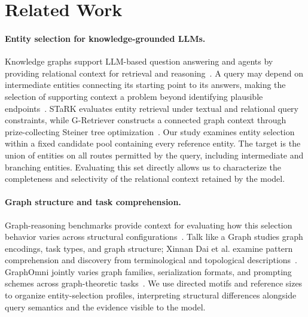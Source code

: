 \section{Related Work}
\label{sec:related}

\paragraph{Entity selection for knowledge-grounded LLMs.}
Knowledge graphs support LLM-based question answering and agents by providing relational context for retrieval and reasoning~\cite{luo2024rog,ghandi2026graphwalk}. A query may depend on intermediate entities connecting its starting point to its answers, making the selection of supporting context a problem beyond identifying plausible endpoints~\cite{luo2024rog}. STaRK evaluates entity retrieval under textual and relational query constraints, while G-Retriever constructs a connected graph context through prize-collecting Steiner tree optimization~\cite{wu2024stark,he2024gretriever}. Our study examines entity selection within a fixed candidate pool containing every reference entity. The target is the union of entities on all routes permitted by the query, including intermediate and branching entities. Evaluating this set directly allows us to characterize the completeness and selectivity of the relational context retained by the model.

\paragraph{Graph structure and task comprehension.}
Graph-reasoning benchmarks provide context for evaluating how this selection behavior varies across structural configurations~\cite{fatemi2024talklikegraph,dai2025graphpatterns,xu2026graphomni}. Talk like a Graph studies graph encodings, task types, and graph structure; Xinnan Dai et al. examine pattern comprehension and discovery from terminological and topological descriptions~\cite{fatemi2024talklikegraph,dai2025graphpatterns}. GraphOmni jointly varies graph families, serialization formats, and prompting schemes across graph-theoretic tasks~\cite{xu2026graphomni}. We use directed motifs and reference sizes to organize entity-selection profiles, interpreting structural differences alongside query semantics and the evidence visible to the model.

